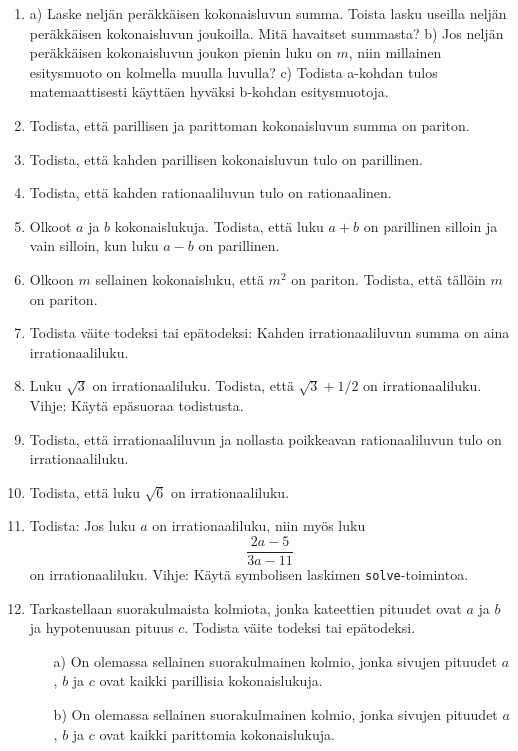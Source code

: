 \begin{enumerate}

\item a) Laske neljän peräkkäisen kokonaisluvun summa.
Toista lasku useilla neljän peräkkäisen kokonaisluvun
joukoilla. Mitä havaitset summasta?
b) Jos neljän peräkkäisen kokonaisluvun joukon pienin
luku on $m$, niin millainen esitysmuoto on kolmella
muulla luvulla?
c) Todista a-kohdan tulos matemaattisesti käyttäen
hyväksi b-kohdan esitysmuotoja.

\item Todista, että parillisen ja parittoman kokonaisluvun
summa on pariton.

\item Todista, että kahden parillisen kokonaisluvun tulo
on parillinen.

\item Todista, että kahden rationaaliluvun tulo on rationaalinen.

\item Olkoot $a$ ja $b$ kokonaislukuja. Todista, että luku
$a + b$ on parillinen silloin ja vain silloin, kun luku
$a - b$ on parillinen.

\item Olkoon $m$ sellainen kokonaisluku, että $m^2$ on
pariton. Todista, että tällöin $m$ on pariton.

\item Todista väite todeksi tai epätodeksi: Kahden
irrationaaliluvun summa on aina irrationaaliluku.

\item Luku $\sqrt{3}$ on irrationaaliluku. Todista,
että $\sqrt{3}+1/2$ on irrationaaliluku. Vihje: Käytä
epäsuoraa todistusta.

\item Todista, että irrationaaliluvun ja nollasta poikkeavan rationaaliluvun tulo on irrationaaliluku.

\item Todista, että luku $\sqrt{6}$ on irrationaaliluku.

\item Todista: Jos luku $a$ on irrationaaliluku, niin
myös luku
\[
\frac{2a-5}{3a-11}
\]
on irrationaaliluku. Vihje: Käytä symbolisen laskimen
{\tt solve}-toimintoa.

\item
Tarkastellaan suorakulmaista kolmiota, jonka kateettien
pituudet ovat $a$ ja $b$ ja hypotenuusan pituus $c$.
Todista väite todeksi tai epätodeksi.

\begin{itemize}
\item[a)] On olemassa sellainen suorakulmainen kolmio,
jonka sivujen pituudet $a$, $b$ ja $c$ ovat kaikki parillisia kokonaislukuja.
\item[b)] On olemassa sellainen suorakulmainen kolmio,
jonka sivujen pituudet $a$, $b$ ja $c$ ovat kaikki 
parittomia kokonaislukuja.
\end{itemize}


\end{enumerate}
